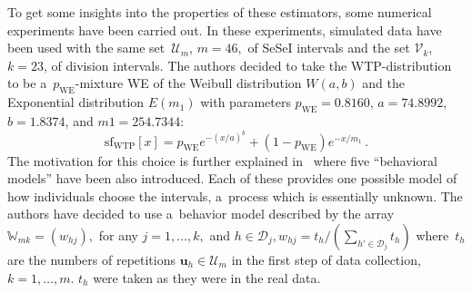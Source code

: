 \begin{multicols}{2}
\noindent
To get some insights into the  properties of these estimators, 
some numerical experiments have been carried out.
 In these experiments, simulated data have been used with
  the same set~$\mathcal{U}_m$, $m=46,$ of SeSeI intervals and the set $\mathcal{V}_k$, 
  $k=23$, of division intervals. The authors decided to take the
WTP-distribution to be a~$p_{\mathrm{WE}}$-mixture WE of the Weibull
distribution $W(a, b)$ and the Exponential distribution $ E(m_1)$
with parameters $ p_{\mathrm{WE}}=0.8160$, $a=74.8992$, $b=1.8374$,
and $m1=254.7344$:
\begin{equation}
\label{FR-61}
\mathrm{sf}_{\mathrm{WTP}} [x]= p_{\mathrm{WE}} e^{-(x/a)^b} + (1-p_{\mathrm{WE}})e^{-x/m_1} \,.
\end{equation}
 The motivation for this choice is further explained in~\cite{BK:BK12} 
 where  five  ``behavioral models'' have been also introduced. 
 Each of these provides one possible model of how individuals choose the intervals,
 a~process which is essentially unknown. The authors have decided to use a~behavior model described by the array
$\mathbb W_{ m k} =(w_{hj}),$ for any $j=1, \ldots, k,$ and $h\in
\mathcal{D}_j, w_{hj} =t_h/\left ( \sum_{h'\in \mathcal{D}_j} t_h \right )$
 where~$t_h$ are the numbers of repetitions $\mathbf{u}_h\in\mathcal{U}_m$ 
 in the first step of data collection, $k=1, \ldots, m.$
$t_h$ were taken as they were in the real data.


\end{multicols}
